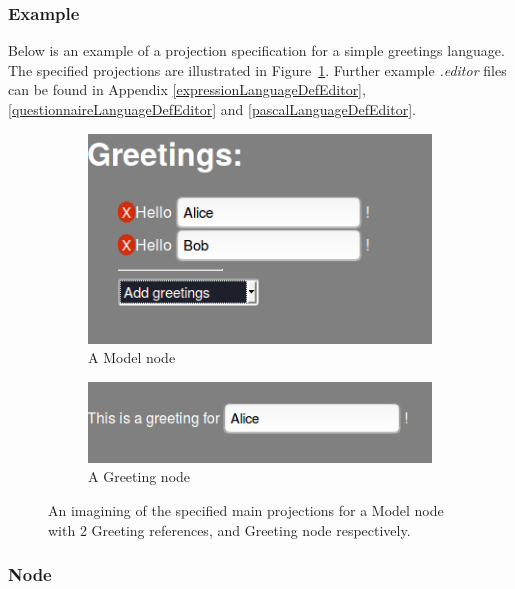 \documentclass{article}
\begin{document}
{\subsubsection{Example}
Below is an example of a projection specification for a simple greetings language. The specified projections are illustrated in  Figure~\ref{fig:greetingProjection}. Further example \emph{.editor} files can be found in Appendix \ref{expressionLanguageDefEditor}, \ref{questionnaireLanguageDefEditor} and \ref{pascalLanguageDefEditor}.

\begin{figure}[h!]
  \centering
  \begin{subfigure}[b]{0.45\linewidth}
    \includegraphics[width=\linewidth]{./Screenshots/greetingsProjection1.png}
    \caption{A Model node}
  \end{subfigure}
  \begin{subfigure}[b]{0.45\linewidth}
	\includegraphics[width=\linewidth]{./Screenshots/greetingsProjection2.png}
    \caption{A Greeting node}
  \end{subfigure}
  \caption{An imagining of the specified main projections for a Model node with 2 Greeting references, and Greeting node respectively.}
  \label{fig:greetingProjection}
\end{figure}

\subsubsection{Node}

}
\end{document}
